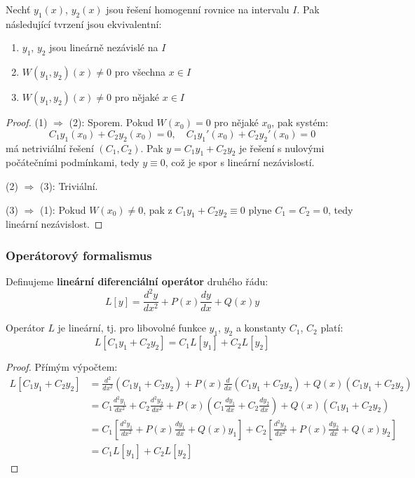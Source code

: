 \begin{theorem}
Nechť $y_1(x)$, $y_2(x)$ jsou řešení homogenní rovnice na intervalu $I$. Pak následující tvrzení jsou ekvivalentní:
\begin{enumerate}
\item $y_1$, $y_2$ jsou lineárně nezávislé na $I$
\item $W(y_1, y_2)(x) \neq 0$ pro všechna $x \in I$
\item $W(y_1, y_2)(x) \neq 0$ pro nějaké $x \in I$
\end{enumerate}
\end{theorem}

\begin{proof}
(1) $\Rightarrow$ (2): Sporem. Pokud $W(x_0) = 0$ pro nějaké $x_0$, pak systém:
\[
C_1y_1(x_0) + C_2y_2(x_0) = 0, \quad C_1y_1'(x_0) + C_2y_2'(x_0) = 0
\]
má netriviální řešení $(C_1, C_2)$. Pak $y = C_1y_1 + C_2y_2$ je řešení s nulovými počátečními podmínkami, tedy $y \equiv 0$, což je spor s lineární nezávislostí.

(2) $\Rightarrow$ (3): Triviální.

(3) $\Rightarrow$ (1): Pokud $W(x_0) \neq 0$, pak z $C_1y_1 + C_2y_2 \equiv 0$ plyne $C_1 = C_2 = 0$, tedy lineární nezávislost.
\end{proof}

\subsubsection{Operátorový formalismus}
\label{subsubsec:operatorovy-formalismus}

\begin{definition}
Definujeme \textbf{lineární diferenciální operátor} druhého řádu:
\[
L[y] = \frac{d^2y}{dx^2} + P(x)\frac{dy}{dx} + Q(x)y
\]
\end{definition}

\begin{theorem}
Operátor $L$ je lineární, tj. pro libovolné funkce $y_1$, $y_2$ a konstanty $C_1$, $C_2$ platí:
\[
L[C_1y_1 + C_2y_2] = C_1L[y_1] + C_2L[y_2]
\]
\end{theorem}

\begin{proof}
Přímým výpočtem:
\begin{align*}
L[C_1y_1 + C_2y_2] &= \frac{d^2}{dx^2}(C_1y_1 + C_2y_2) + P(x)\frac{d}{dx}(C_1y_1 + C_2y_2) + Q(x)(C_1y_1 + C_2y_2) \\
&= C_1\frac{d^2y_1}{dx^2} + C_2\frac{d^2y_2}{dx^2} + P(x)\left(C_1\frac{dy_1}{dx} + C_2\frac{dy_2}{dx}\right) + Q(x)(C_1y_1 + C_2y_2) \\
&= C_1\left[\frac{d^2y_1}{dx^2} + P(x)\frac{dy_1}{dx} + Q(x)y_1\right] + C_2\left[\frac{d^2y_2}{dx^2} + P(x)\frac{dy_2}{dx} + Q(x)y_2\right] \\
&= C_1L[y_1] + C_2L[y_2]
\end{align*}
\end{proof}

